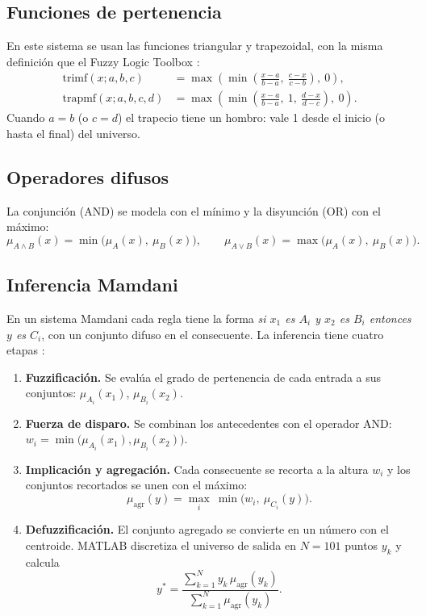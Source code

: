 \documentclass[11pt,letterpaper]{article}
\begin{document}
\subsection{Funciones de pertenencia}
En este sistema se usan las funciones triangular y trapezoidal, con la misma definición que el Fuzzy Logic Toolbox \cite{mathworks}:
\begin{align}
\text{trimf}(x;a,b,c) &= \max\!\left(\min\!\left(\frac{x-a}{b-a},\ \frac{c-x}{c-b}\right),\ 0\right), \\
\text{trapmf}(x;a,b,c,d) &= \max\!\left(\min\!\left(\frac{x-a}{b-a},\ 1,\ \frac{d-x}{d-c}\right),\ 0\right).
\end{align}
Cuando $a = b$ (o $c = d$) el trapecio tiene un hombro: vale 1 desde el inicio (o hasta el final) del universo.

\subsection{Operadores difusos}
La conjunción (AND) se modela con el mínimo y la disyunción (OR) con el máximo:
\begin{equation}
\mu_{A \wedge B}(x) = \min\big(\mu_A(x),\ \mu_B(x)\big), \qquad \mu_{A \vee B}(x) = \max\big(\mu_A(x),\ \mu_B(x)\big).
\end{equation}

\subsection{Inferencia Mamdani}
En un sistema Mamdani \cite{mamdani} cada regla tiene la forma \emph{si $x_1$ es $A_i$ y $x_2$ es $B_i$ entonces $y$ es $C_i$}, con un conjunto difuso en el consecuente. La inferencia tiene cuatro etapas \cite{ross}:
\begin{enumerate}[leftmargin=*]
  \item \textbf{Fuzzificación.} Se evalúa el grado de pertenencia de cada entrada a sus conjuntos: $\mu_{A_i}(x_1)$, $\mu_{B_i}(x_2)$.
  \item \textbf{Fuerza de disparo.} Se combinan los antecedentes con el operador AND: $w_i = \min\big(\mu_{A_i}(x_1), \mu_{B_i}(x_2)\big)$.
  \item \textbf{Implicación y agregación.} Cada consecuente se recorta a la altura $w_i$ y los conjuntos recortados se unen con el máximo:
  \begin{equation}
  \mu_{\text{agr}}(y) = \max_i \ \min\big(w_i,\ \mu_{C_i}(y)\big).
  \end{equation}
  \item \textbf{Defuzzificación.} El conjunto agregado se convierte en un número con el centroide. MATLAB discretiza el universo de salida en $N = 101$ puntos $y_k$ y calcula
  \begin{equation}
  \label{eq:centroide}
  y^* = \frac{\sum_{k=1}^{N} y_k\, \mu_{\text{agr}}(y_k)}{\sum_{k=1}^{N} \mu_{\text{agr}}(y_k)}.
  \end{equation}
\end{enumerate}
\end{document}
